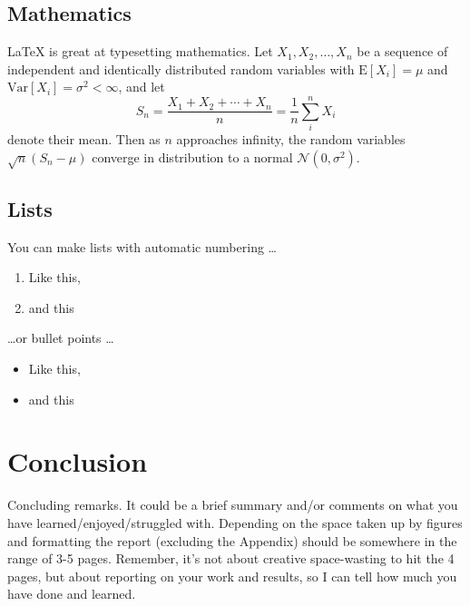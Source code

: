 \documentclass[12pt]{article}
\begin{document}
\subsection{Mathematics}

\LaTeX{} is great at typesetting mathematics. Let $X_1, X_2, \ldots, X_n$ be a sequence of independent and identically distributed random variables with $\text{E}[X_i] = \mu$ and $\text{Var}[X_i] = \sigma^2 < \infty$, and let
$$S_n = \frac{X_1 + X_2 + \cdots + X_n}{n}
      = \frac{1}{n}\sum_{i}^{n} X_i$$
denote their mean. Then as $n$ approaches infinity, the random variables $\sqrt{n}(S_n - \mu)$ converge in distribution to a normal $\mathcal{N}(0, \sigma^2)$.

\subsection{Lists}

You can make lists with automatic numbering \dots

\begin{enumerate}
\item Like this,
\item and this
\end{enumerate}
\dots or bullet points \dots
\begin{itemize}
\item Like this,
\item and this
\end{itemize}

\section{Conclusion}

Concluding remarks.  It could be a brief summary and/or comments on what you have learned/enjoyed/struggled with.      Depending on the space taken up by figures and formatting the report (excluding the Appendix) should be somewhere in the range of 3-5 pages.  Remember, it's not about creative space-wasting to hit the 4 pages, but about reporting on your work and results, so I can tell how much you have done and learned.  



\end{document}
